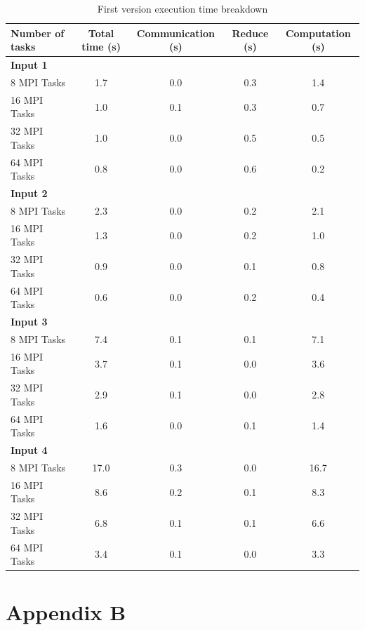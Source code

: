 \documentclass{article}
\begin{document}
\begin{table}[htbp]
  \centering
  \begin{tabular}{lcccc}
    \toprule
    \textbf{Number of tasks} & \textbf{Total time (s)} & \textbf{Communication (s)} & \textbf{Reduce (s)} & \textbf{Computation (s)} \\
    \midrule
    \textbf{Input 1} & & & & \\
    8 MPI Tasks & 1.7 & 0.0 & 0.3 & 1.4 \\
    16 MPI Tasks & 1.0 & 0.1 & 0.3 & 0.7 \\
    32 MPI Tasks & 1.0 & 0.0 & 0.5 & 0.5 \\
    64 MPI Tasks & 0.8 & 0.0 & 0.6 & 0.2 \\
    \midrule
    \textbf{Input 2} & & & & \\
    8 MPI Tasks & 2.3 & 0.0 & 0.2 & 2.1 \\
    16 MPI Tasks & 1.3 & 0.0 & 0.2 & 1.0 \\
    32 MPI Tasks & 0.9 & 0.0 & 0.1 & 0.8 \\
    64 MPI Tasks & 0.6 & 0.0 & 0.2 & 0.4 \\
    \midrule
    \textbf{Input 3} & & & & \\
    8 MPI Tasks & 7.4 & 0.1 & 0.1 & 7.1 \\
    16 MPI Tasks & 3.7 & 0.1 & 0.0 & 3.6 \\
    32 MPI Tasks & 2.9 & 0.1 & 0.0 & 2.8 \\
    64 MPI Tasks & 1.6 & 0.0 & 0.1 & 1.4 \\
    \midrule
    \textbf{Input 4} & & & & \\
    8 MPI Tasks & 17.0 & 0.3 & 0.0 & 16.7 \\
    16 MPI Tasks & 8.6 & 0.2 & 0.1 & 8.3 \\
    32 MPI Tasks & 6.8 & 0.1 & 0.1 & 6.6 \\
    64 MPI Tasks & 3.4 & 0.1 & 0.0 & 3.3 \\
    \bottomrule
  \end{tabular}
  \caption{First version execution time breakdown}
  \label{tab:mpi_performance}
\end{table}

\newpage

\section{Appendix B}
\end{document}
